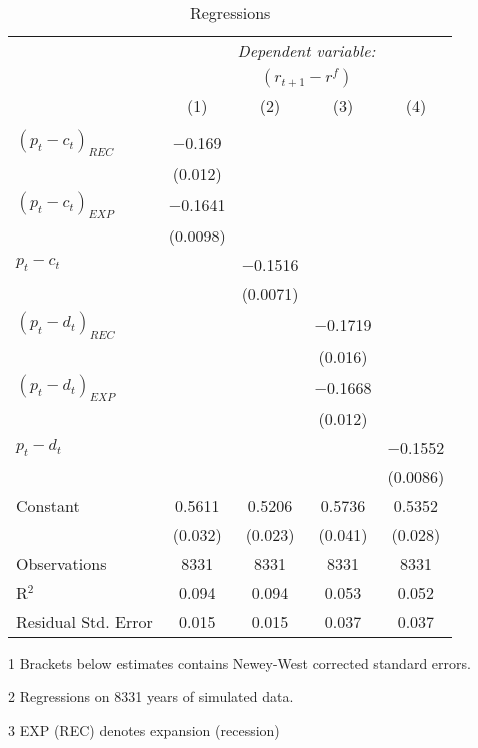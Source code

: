 \begin{table}[H]
\centering   
  \caption{Regressions}           
  \label{tab:regress}     
  \begin{threeparttable}
\begin{tabular}{@{\hspace{5pt}}l@{\hspace{5pt}}cccc} 
\toprule 
 & \multicolumn{4}{c}{\textit{Dependent variable:}} \\ 
 & \multicolumn{4}{c}{$\left(r_{t+1}-r^f\right)$} \\ 
 \cmidrule(rr){2-5}
 & (1)   &   (2) &   (3) &  (4)\\ 
\midrule  
\\[-2.1ex] $\left( p_t - c_t \right)_{REC}$ & $-$0.169& &  \\ 
  & (0.012) & & & \\ 
 \addlinespace 
  $\left( p_t - c_t \right)_{EXP}$ & $-$0.1641 & &  \\ 
  & (0.0098) & & &\\ 
 \addlinespace 
 $p_t - c_t$ &  & $-$0.1516 & & \\
 & & (0.0071) \\
 \addlinespace 
  $\left( p_t - d_t \right)_{REC}$ & & & $-$0.1719&  \\ 
  & & & (0.016)    &\\ 
 \addlinespace 
  $\left( p_t - d_t \right)_{EXP}$ & & & $-$0.1668&  \\ 
  &  & & (0.012) &\\ 
 \addlinespace 
 $p_t - d_t$ & & & & $-$0.1552 \\
 & & & &  (0.0086)  \\
 \addlinespace 
 Constant &0.5611 &0.5206 &0.5736 &0.5352 \\ 
  &(0.032) &(0.023) &(0.041) &(0.028) \\ 
 \addlinespace 
\midrule  
Observations & 8331 & 8331 & 8331 &8331\\ 
R$^{2}$ &0.094 & 0.094 & 0.053 &0.052\\ 
Residual Std. Error &0.015 & 0.015 &0.037 & 0.037  \\ 
\bottomrule 
\end{tabular} 
\begin{tablenotes}
\footnotesize{
\item[1] Brackets below estimates contains Newey-West corrected standard errors. 
\item[2] Regressions on 8331 years of simulated data.
\item[3] EXP (REC) denotes expansion (recession)
}
\end{tablenotes}
\end{threeparttable}
\end{table} 

